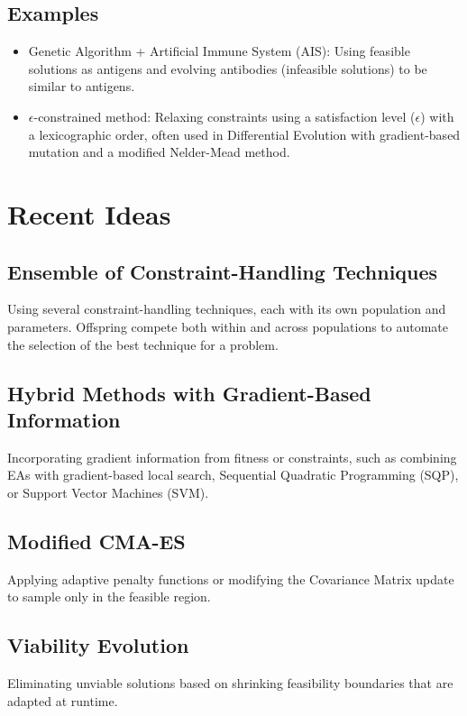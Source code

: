 \subsection*{Examples}

\begin{itemize}
    \item Genetic Algorithm + Artificial Immune System (AIS): Using feasible solutions as antigens and evolving antibodies (infeasible solutions) to be similar to antigens.
    \item \(\epsilon\)-constrained method:  Relaxing constraints using a satisfaction level (\(\epsilon\)) with a lexicographic order, often used in Differential Evolution with gradient-based mutation and a modified Nelder-Mead method.
\end{itemize}

\section{Recent Ideas}

\subsection*{Ensemble of Constraint-Handling Techniques}
Using several constraint-handling techniques, each with its own population and parameters. Offspring compete both within and across populations to automate the selection of the best technique for a problem.

\subsection*{Hybrid Methods with Gradient-Based Information}
Incorporating gradient information from fitness or constraints, such as combining EAs with gradient-based local search, Sequential Quadratic Programming (SQP), or Support Vector Machines (SVM).

\subsection*{Modified CMA-ES}
Applying adaptive penalty functions or modifying the Covariance Matrix update to sample only in the feasible region.

\subsection*{Viability Evolution}
Eliminating unviable solutions based on shrinking feasibility boundaries that are adapted at runtime.

